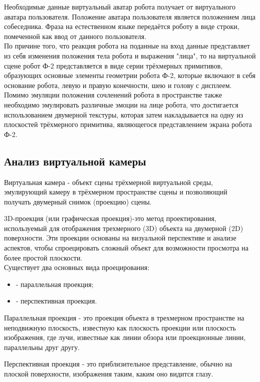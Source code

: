 Необходимые данные виртуальный аватар робота получает от виртуального аватара пользователя. Положение аватара пользователя является положением лица собеседника. Фраза на естественном языке передаётся роботу в виде строки, помеченной как ввод от данного пользователя.\\

По причине того, что реакция робота на поданные на вход данные представляет из себя изменения положения тела робота и выражения "лица", то на виртуальной сцене робот Ф-2 представляется в виде серии трёхмерных примитивов, образующих основные элементы геометрии робота Ф-2, которые включают в себя основание робота, левую и правую конечности, шею и голову с дисплеем. Помимо эмуляции положения сочленений робота в пространстве также необходимо эмулировать различные эмоции на лице робота, что достигается использованием двумерной текстуры, которая затем накладывается на одну из плоскостей трёхмерного примитива, являющегося представлением экрана робота Ф-2.

\subsection{Анализ виртуальной камеры}
Виртуальная камера - объект сцены трёхмерной виртуальной среды, эмулирующий камеру в трёхмерном пространстве сцены и позволяющий получать двумерный снимок (проекцию) сцены.

3D-проекция (или графическая проекция)-это метод проектирования, используемый для отображения трехмерного (3D) объекта на двумерной (2D) поверхности. Эти проекции основаны на визуальной перспективе и анализе аспектов, чтобы спроецировать сложный объект для возможности просмотра на более простой плоскости. \cite{petty}\\

Существует два основных вида проецирования:
\begin{itemize}
\item - параллельная проекция;\\
\item - перспективная проекция.\\
\end{itemize}

Параллельная проекция - это проекция объекта в трехмерном пространстве на неподвижную плоскость, известную как плоскость проекции или плоскость изображения, где лучи, известные как линии обзора или проекционные линии, параллельны друг другу. 

Перспективная проекция - это приблизительное представление, обычно на плоской поверхности, изображения таким, каким оно видится глазу.


